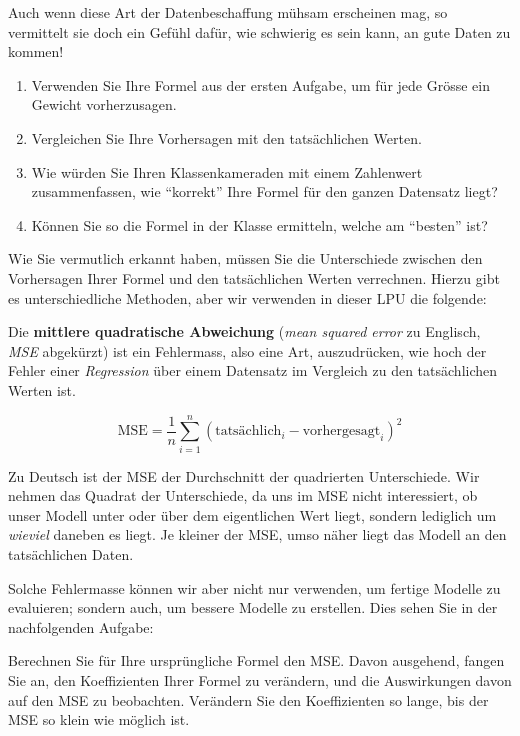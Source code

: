 \begin{lpu}
Auch wenn diese Art der Datenbeschaffung mühsam erscheinen mag, so vermittelt sie doch ein Gefühl dafür, wie schwierig es sein kann, an gute Daten zu kommen!

\begin{aufgabe}{3}
\begin{enumerate}
    \item Verwenden Sie Ihre Formel aus der ersten Aufgabe, um für jede Grösse ein Gewicht vorherzusagen. 
    \item Vergleichen Sie Ihre Vorhersagen mit den tatsächlichen Werten.
    \item Wie würden Sie Ihren Klassenkameraden mit einem Zahlenwert zusammenfassen, wie ``korrekt'' Ihre Formel für den ganzen Datensatz liegt? 
    \item Können Sie so die Formel in der Klasse ermitteln, welche am ``besten'' ist?
\end{enumerate}
\end{aufgabe}

Wie Sie vermutlich erkannt haben, müssen Sie die Unterschiede zwischen den Vorhersagen Ihrer Formel und den tatsächlichen Werten verrechnen. Hierzu gibt es unterschiedliche Methoden, aber wir verwenden in dieser LPU die folgende:

\begin{theorie}
    Die \textbf{mittlere quadratische Abweichung} (\textit{mean squared error} zu Englisch, \textit{MSE} abgekürzt) ist ein Fehlermass, also eine Art, auszudrücken, wie hoch der Fehler einer \textit{Regression} über einem Datensatz im Vergleich zu den tatsächlichen Werten ist.

     \[
  \text{MSE} = \frac{1}{n} \sum_{i=1}^{n} \left( \text{tatsächlich}_{i} - \text{vorhergesagt}_{i} \right)^2
  \]

  Zu Deutsch ist der MSE der Durchschnitt der quadrierten Unterschiede. Wir nehmen das Quadrat der Unterschiede, da uns im MSE nicht interessiert, ob unser Modell unter oder über dem eigentlichen Wert liegt, sondern lediglich um \textit{wieviel} daneben es liegt. Je kleiner der MSE, umso näher liegt das Modell an den tatsächlichen Daten.
\end{theorie}

Solche Fehlermasse können wir aber nicht nur verwenden, um fertige Modelle zu evaluieren; sondern auch, um bessere Modelle zu erstellen. Dies sehen Sie in der nachfolgenden Aufgabe:

\begin{aufgabe}{4}
    Berechnen Sie für Ihre ursprüngliche Formel den MSE. Davon ausgehend, fangen Sie an, den Koeffizienten Ihrer Formel zu verändern, und die Auswirkungen davon auf den MSE zu beobachten. Verändern Sie den Koeffizienten so lange, bis der MSE so klein wie möglich ist.
\end{aufgabe}


\end{lpu}
